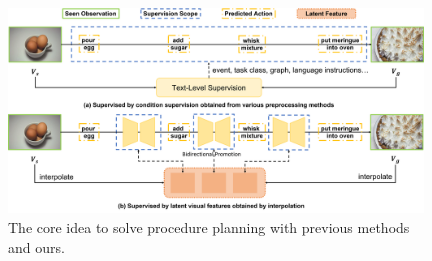 \begin{figure}[t]
\includegraphics[width=0.98\textwidth, keepaspectratio]{figures/fig-task.png}
\caption{The core idea to solve procedure planning with previous methods and ours. }
\label{fig:task}
\end{figure}